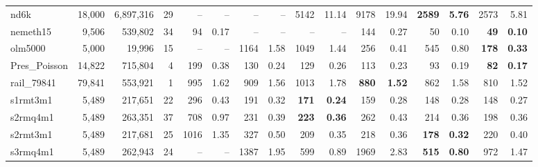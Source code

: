 \begin{landscape}
\begin{table}[p]
\begin{tabular}{lrrr||rr|rr|rr|rr|rr|rr}
                  nd6k  &  18,000  &  6,897,316  &  29  &       --  &       
                  --   &       --  &       --   &     5142 &    11.14  &     
                  9178 &    19.94  & \textbf{    2589} & \textbf{    5.76}  
                  &     2573 &     5.81\\
              nemeth15  &  9,506  &  539,802  &  34  &       94 &     0.17  
              &       --  &       --   &       --  &       --   &      144 
              &     0.27  &       50 &     0.10  & \textbf{      49} & 
              \textbf{    0.10}\\
               olm5000  &  5,000  &  19,996  &  15  &       --  &       --   
               &     1164 &     1.58  &     1049 &     1.44  &      256 &     
               0.41  &      545 &     0.80  & \textbf{     178} & \textbf{    
               0.33}\\
          Pres\_Poisson  &  14,822  &  715,804  &  4  &      199 &     0.38  
          &      130 &     0.24  &      129 &     0.26  &      113 &     0.23  
          &       93 &     0.19  & \textbf{      82} & \textbf{    0.17}\\
            rail\_79841  &  79,841  &  553,921  &  1  &      995 &     1.62  
            &      909 &     1.56  &     1013 &     1.78  & \textbf{     880} & 
            \textbf{    1.52}  &      862 &     1.58  &      810 &     1.52\\
              s1rmt3m1  &  5,489  &  217,651  &  22  &      296 &     0.43  
              &      191 &     0.32  & \textbf{     171} & \textbf{    0.24}  
              &      159 &     0.28  &      148 &     0.28  &      148 &     
              0.27\\
              s2rmq4m1  &  5,489  &  263,351  &  37  &      708 &     0.97  
              &      231 &     0.39  & \textbf{     223} & \textbf{    0.36}  
              &      262 &     0.43  &      214 &     0.36  &      198 &     
              0.36\\
              s2rmt3m1  &  5,489  &  217,681  &  25  &     1016 &     1.35  
              &      327 &     0.50  &      209 &     0.35  &      218 &     
              0.36  & \textbf{     178} & \textbf{    0.32}  &      220 &     
              0.40\\
              s3rmq4m1  &  5,489  &  262,943  &  24  &       --  &       --   
              &     1387 &     1.95  &      599 &     0.89  &     1969 &     
              2.83  & \textbf{     515} & \textbf{    0.80}  &      972 &     
              1.47\\

\end{tabular}
\end{table}
\end{landscape}
